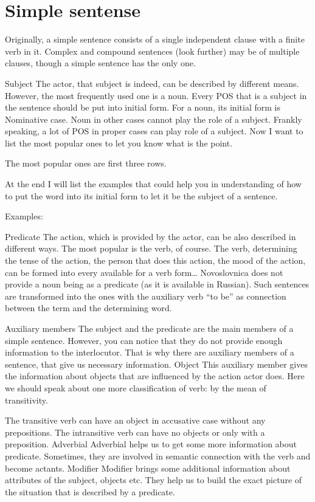 \section{Simple sentense}

Originally, a simple sentence consists of a single independent clause with a finite verb in it. Complex and compound sentences (look further) may be of multiple clauses, though a simple sentence has the only one.

Subject
The actor, that subject is indeed, can be described by different means. However, the most frequently used one is a noun. Every POS that is a subject in the sentence should be put into initial form. For a noun, its initial form is Nominative case. Noun in other cases cannot play the role of a subject.
Frankly speaking, a lot of POS in proper cases can play role of a subject. Now I want to list the most popular ones to let you know what is the point.


The most popular ones are first three rows.

At the end I will list the examples that could help you in understanding of how to put the word into its initial form to let it be the subject of a sentence. 

Examples:


Predicate
The action, which is provided by the actor, can be also described in different ways. The most popular is the verb, of course. The verb, determining the tense of the action, the person that does this action, the mood of the action, can be formed into every available for a verb form… Novoslovnica does not provide a noun being as a predicate (as it is available in Russian). Such sentences are transformed into the ones with the auxiliary verb “to be” as connection between the term and the determining word. 

Auxiliary members
The subject and the predicate are the main members of a simple sentence. However, you can notice that they do not provide  enough information to the interlocutor. That is why there are auxiliary members of a sentence, that give us necessary information.
Object
This auxiliary member gives the information about objects that are influenced by the action actor does. 
Here we should speak about one more classification of verb: by the mean of transitivity.

The transitive verb can have an object in accusative case without any prepositions.
The intransitive verb can have no objects or only with a preposition. 
Adverbial
Adverbial helps us to get some more information about predicate. Sometimes, they are involved in semantic connection with the verb and become actants. 
Modifier 
Modifier brings some additional information about attributes of the subject, objects etc. They help us to build the exact picture of the situation that is described by a predicate.

